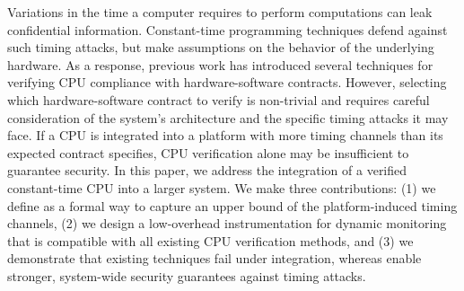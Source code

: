 Variations in the time a computer requires to perform computations can leak confidential information.
Constant-time programming techniques defend against such timing attacks, but make assumptions on the behavior of the underlying hardware.
As a response, previous work has introduced several techniques for verifying CPU compliance with hardware-software contracts.
%
However, selecting which hardware-software contract to verify is non-trivial and requires careful consideration of the system's architecture and the specific timing attacks it may face.
If a CPU is integrated into a platform with more timing channels than its expected contract specifies, CPU verification alone may be insufficient to guarantee security.
In this paper, we address the integration of a verified constant-time CPU into a larger system.
We make three contributions: (1) we define \pics as a formal way to capture an upper bound of the platform-induced timing channels, (2) we design a low-overhead instrumentation for dynamic monitoring that is compatible with all existing CPU verification methods, and (3) we demonstrate that existing techniques fail under integration, whereas \pics enable stronger, system-wide security guarantees against timing attacks.

